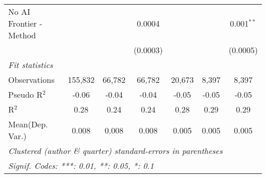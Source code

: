 \begin{tabular}{lcccccc}
   No AI Frontier - Method &                &          & 0.0004         &                &              & 0.001$^{**}$\\   
                           &                &          & (0.0003)       &                &              & (0.0005)\\   
   \midrule
   \emph{Fit statistics}\\
   Observations            & 155,832        & 66,782   & 66,782         & 20,673         & 8,397        & 8,397\\  
   Pseudo R$^2$            & -0.06          & -0.04    & -0.04          & -0.05          & -0.05        & -0.05\\  
   R$^2$                   & 0.28           & 0.24     & 0.24           & 0.28           & 0.29         & 0.29\\  
Mean(Dep. Var.) & 0.008 & 0.008 & 0.008 & 0.005 & 0.005 & 0.005 \\
   \midrule \midrule
   \multicolumn{7}{l}{\emph{Clustered (author \& quarter) standard-errors in parentheses}}\\
   \multicolumn{7}{l}{\emph{Signif. Codes: ***: 0.01, **: 0.05, *: 0.1}}\\
\end{tabular}
\par\endgroup
